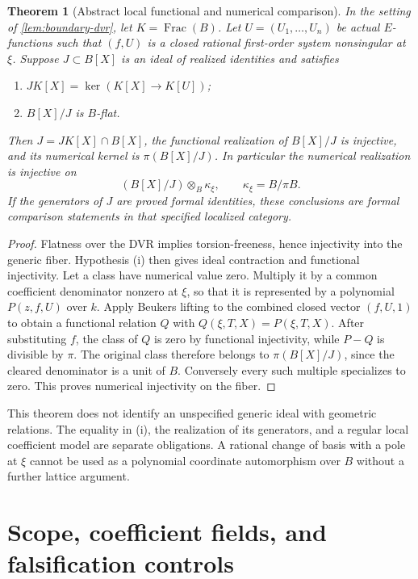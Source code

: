 \documentclass[11pt]{article}
\numberwithin{equation}{section}
\newtheorem{theorem}{Theorem}[section]
\theoremstyle{definition}
\theoremstyle{remark}
\begin{document}
\begin{theorem}[Abstract local functional and numerical comparison]
\label{thm:abstract-specialization}
In the setting of \cref{lem:boundary-dvr}, let $K=\operatorname{Frac}(B)$.
Let $U=(U_1,\ldots,U_n)$ be actual $E$-functions such that $(f,U)$ is a
closed rational first-order system nonsingular at $\xi$.
Suppose $J\subset B[X]$ is an ideal of realized identities and satisfies
\begin{enumerate}[label=\textup{(\roman*)},leftmargin=2.4em]
\item $JK[X]=\ker(K[X]\to K[U])$;
\item $B[X]/J$ is $B$-flat.
\end{enumerate}
Then $J=JK[X]\cap B[X]$, the functional realization of $B[X]/J$ is
injective, and its numerical kernel is $\pi(B[X]/J)$. In particular the
numerical realization is injective on
\[
 (B[X]/J)\otimes_B\kappa_\xi,
 \qquad \kappa_\xi=B/\pi B.
\]
If the generators of $J$ are proved formal identities, these conclusions
are formal comparison statements in that specified localized category.
\end{theorem}
\begin{proof}
Flatness over the DVR implies torsion-freeness, hence injectivity into the
generic fiber. Hypothesis (i) then gives ideal contraction and functional
injectivity. Let a class have numerical value zero. Multiply it by a
common coefficient denominator nonzero at $\xi$, so that it is represented
by a polynomial $P(z,f,U)$ over $k$. Apply Beukers lifting to the combined
closed vector $(f,U,1)$ to obtain a functional relation $Q$ with
$Q(\xi,T,X)=P(\xi,T,X)$. After substituting $f$, the class of $Q$ is
zero by functional injectivity, while $P-Q$ is divisible by $\pi$.
The original class therefore belongs to $\pi(B[X]/J)$, since the cleared
denominator is a unit of $B$. Conversely every such multiple specializes
to zero. This proves numerical injectivity on the fiber.
\end{proof}

This theorem does not identify an unspecified generic ideal with geometric
relations. The equality in (i), the realization of its generators, and a
regular local coefficient model are separate obligations. A rational
change of basis with a pole at $\xi$ cannot be used as a polynomial
coordinate automorphism over $B$ without a further lattice argument.

\section{Scope, coefficient fields, and falsification controls}
\label{sec:scope}
\end{document}
